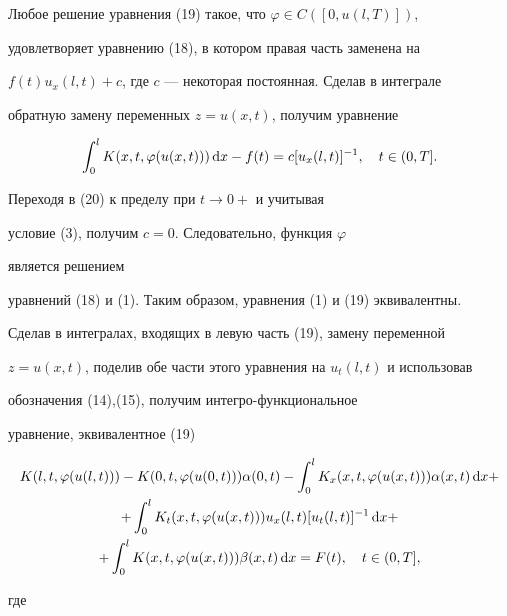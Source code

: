 \begin{pf}
Любое решение уравнения (19) такое, что $\varphi \in C([0,u(l,T)])$,


удовлетворяет уравнению (18), в котором правая часть заменена на


$f(t)u_x(l,t) + c$, где $c$ --- некоторая постоянная. Сделав в интеграле


обратную замену переменных $z=u(x,t)$, получим уравнение


\begin{equation}


\int_0^l K(x,t,\varphi (u(x,t)))\d x-f(t)=c[u_x(l,t)]^{-


1},\q t\in (0,T].




\end{equation}


Переходя в (20) к пределу при $t\to 0+$ и учитывая


условие (3), получим $c=0$. Следовательно, функция $\varphi$


является решением


уравнений (18) и (1). Таким образом, уравнения (1) и (19) эквивалентны.





Сделав в интегралах, входящих в левую часть (19), замену переменной


$z=u(x,t)$, поделив обе части этого уравнения на $u_t(l,t)$ и использовав


обозначения (14),(15), получим интегро-функциональное


уравнение, эквивалентное (19)


\begin{multline}


K(l,t,\varphi (u(l,t))) - K(0,t,\varphi


(u(0,t)))\alpha(0,t)-


\int_0^l K_x(x,t,\varphi (u(x,t)))\alpha (x,t)\d x+\\


+ \int_0^l K_t(x,t,\varphi


(u(x,t)))u_x(l,t)[u_t(l,t)]^{-1}\d x+\\


+\int_0^l K(x,t,\varphi (u(x,t)))\beta (x,t)\d


x=F(t),\q t\in (0,T],




\end{multline}


где


\begin{equation}



\end{equation}
\end{pf}
